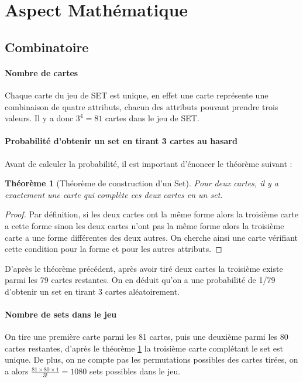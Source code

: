 \documentclass[a4paper,12pt,titlepage]{article}
\theoremstyle{plain}
\newtheorem{thm}{Théorème}
\theoremstyle{definition}
\begin{document}
\section{Aspect Mathématique}
\subsection{Combinatoire}

\paragraph{Nombre de cartes} Chaque carte du jeu de SET est unique, en effet une carte représente une combinaison de quatre attributs, chacun des attributs pouvant prendre trois valeurs. 
Il y a donc $3^4=81$ cartes dans le jeu de SET.

\paragraph{Probabilité d'obtenir un set en tirant 3 cartes au hasard} Avant de calculer la probabilité, il est important d'énoncer le théorème suivant :

\begin{thm}[Théorème de construction d'un Set]\label{thm:Construction}
Pour deux cartes, il y a exactement une carte qui complète ces deux cartes en un set.
\end{thm}
\begin{proof}
Par définition, si les deux cartes ont la même forme alors la troisième carte a cette forme sinon les deux cartes n'ont pas la même forme alors la troisième carte a une forme différentes des deux autres. On cherche ainsi une carte vérifiant cette condition pour la forme et pour les autres attributs.
\end{proof}
D'après le théorème précédent, après avoir tiré deux cartes la troisième existe parmi les 79 cartes restantes. On en déduit qu'on a une probabilité de 1/79 d'obtenir un set en tirant 3 cartes aléatoirement.

\paragraph{Nombre de sets dans le jeu} On tire une première carte parmi les 81 cartes, puis une deuxième parmi les 80 cartes restantes, d'après le théorème \ref{thm:Construction} la troisième carte complétant le set est unique. 
De plus, on ne compte pas les permutations possibles des cartes tirées, on a alors $\frac{81 \times 80 \times 1}{3!} = 1080$ sets possibles dans le jeu.
\end{document}
